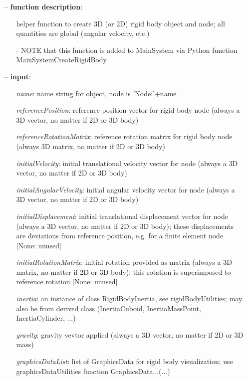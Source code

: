 \begin{itemize}[leftmargin=0.7cm]
\item[--]
{\bf function description}: \vspace{-6pt}
\begin{itemize}[leftmargin=1.2cm]
\setlength{\itemindent}{-0.7cm}
\item[]helper function to create 3D (or 2D) rigid body object and node; all quantities are global (angular velocity, etc.)
\item[]- NOTE that this function is added to MainSystem via Python function MainSystemCreateRigidBody.
\end{itemize}
\item[--]
{\bf input}: \vspace{-6pt}
\begin{itemize}[leftmargin=1.2cm]
\setlength{\itemindent}{-0.7cm}
\item[]{\it name}: name string for object, node is 'Node:'+name
\item[]{\it referencePosition}: reference position vector for rigid body node (always a 3D vector, no matter if 2D or 3D body)
\item[]{\it referenceRotationMatrix}: reference rotation matrix for rigid body node (always 3D matrix, no matter if 2D or 3D body)
\item[]{\it initialVelocity}: initial translational velocity vector for node (always a 3D vector, no matter if 2D or 3D body)
\item[]{\it initialAngularVelocity}: initial angular velocity vector for node (always a 3D vector, no matter if 2D or 3D body)
\item[]{\it initialDisplacement}: initial translational displacement vector for node (always a 3D vector, no matter if 2D or 3D body); these displacements are deviations from reference position, e.g. for a finite element node [None: unused]
\item[]{\it initialRotationMatrix}: initial rotation provided as matrix (always a 3D matrix, no matter if 2D or 3D body); this rotation is superimposed to reference rotation [None: unused]
\item[]{\it inertia}: an instance of class RigidBodyInertia, see rigidBodyUtilities; may also be from derived class (InertiaCuboid, InertiaMassPoint, InertiaCylinder, ...)
\item[]{\it gravity}: gravity vevtor applied (always a 3D vector, no matter if 2D or 3D mass)
\item[]{\it graphicsDataList}: list of GraphicsData for rigid body visualization; use graphicsDataUtilities function GraphicsData...(...)

\end{itemize}
\end{itemize}
